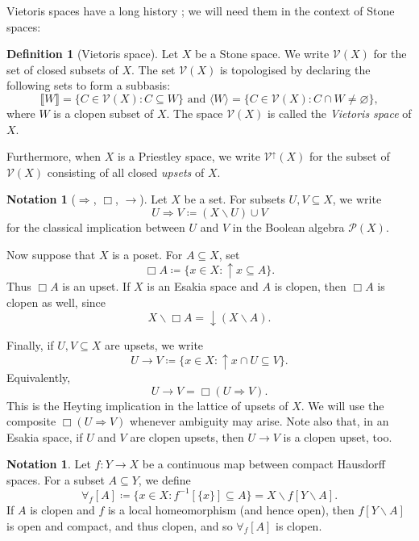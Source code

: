 \documentclass[12pt]{amsart}
\theoremstyle{plain}
\theoremstyle{definition}
\newtheorem{definition}[theorem]{Definition}
\newtheorem{notation}[theorem]{Notation}
\newcommand{\V}{\mathcal{V}}
\newcommand{\Vu}{\V^{\uparrow}}
\newcommand{\climp}{\Rightarrow}
\renewcommand{\u}{{\uparrow}}
\renewcommand{\d}{{\downarrow}}
\begin{document}
Vietoris spaces have a long history \cite{Michael1951TopologiesOS}; we will need them in the context of Stone spaces: 

\begin{definition}[Vietoris space] \label{d:Vietoris}
    Let $X$ be a Stone space. We write $\V(X)$ for the set of closed subsets of $X$.
    The set $\V(X)$ is topologised by declaring the following sets to form a subbasis:
    \[
        \llbracket W \rrbracket=\{C\in \V(X) : C\subseteq W\} \text{ and } \langle W\rangle=\{C\in \V(X) : C\cap W\neq \varnothing\},
    \]
    where $W$ is a clopen subset of $X$.
    The space $\V(X)$ is called the \emph{Vietoris space} of $X$.
    
    Furthermore, when $X$ is a Priestley space, we write $\Vu(X)$ for the subset of $\V(X)$ consisting of all closed \emph{upsets} of $X$.
\end{definition}

\begin{notation}[$\climp$, $\Box$, $\to$]\label{not:box-heyting-ops}
Let $X$ be a set. For subsets $U,V\subseteq X$, we write
\[
    U\climp V \coloneqq (X\smallsetminus U)\cup V
\]
for the classical implication between $U$ and $V$ in the Boolean algebra $\mathcal P(X)$.

Now suppose that $X$ is a poset. For $A\subseteq X$, set
\[
    \Box A \coloneqq \{x\in X : {\u}x\subseteq A\}.
\]
Thus $\Box A$ is an upset. If $X$ is an Esakia space and $A$ is clopen, then $\Box A$ is clopen as well, since
\[
    X\smallsetminus \Box A = {\d}(X\smallsetminus A).
\]

Finally, if $U,V\subseteq X$ are upsets, we write
\[
    U\to V \coloneqq \{x\in X : {\u}x\cap U \subseteq V\}.
\]
Equivalently,
\[
    U\to V=\Box(U\climp V).
\]
This is the Heyting implication in the lattice of upsets of $X$.  We will use the composite $\Box(U\climp V)$ whenever ambiguity may arise. Note also that, in an Esakia space, if $U$ and $V$ are clopen upsets, then $U\rightarrow V$ is a clopen upset, too.
\end{notation}

\begin{notation} \label{not:forall-along-map}
    Let $f\colon Y\to X$ be a continuous map between compact Hausdorff spaces. 
    For a subset $A\subseteq Y$, we define
    \[
        \forall_f[A]\coloneqq \{x\in X : f^{-1}[\{x\}]\subseteq A\} = X\smallsetminus f[Y\smallsetminus A].
    \]
    If $A$ is clopen and $f$ is a local homeomorphism (and hence open), then $f[Y\smallsetminus A]$ is open and compact, and thus clopen, and so $\forall_f[A]$ is clopen.
\end{notation}
\end{document}
